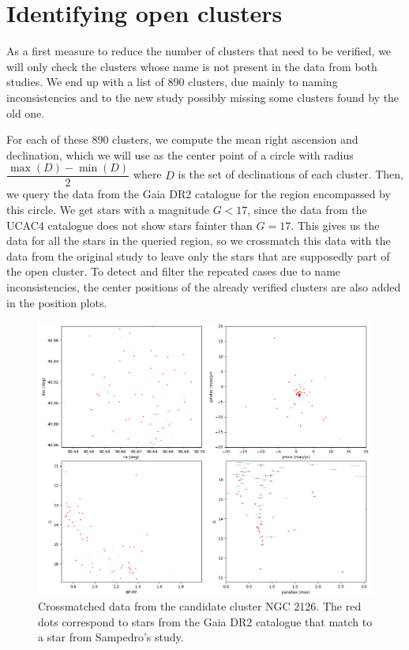 \documentclass[twocolumn]{revtex4}
\begin{document}
\section{Identifying open clusters}

As a first measure to reduce the number of clusters that need to be verified, we will only check the clusters whose name is not present in the data from both studies. We end up with a list of 890 clusters, due mainly to naming inconsistencies and to the new study possibly missing some clusters found by the old one.

For each of these 890 clusters, we compute the mean right ascension and declination, which we will use as the center point of a circle with radius $\dfrac{\max(D) - \min(D)}{2}$ where $D$ is the set of declinations of each cluster. Then, we query the data from the Gaia DR2 catalogue for the region encompassed by this circle. We get stars with a magnitude $G < 17$, since the data from the UCAC4 catalogue does not show stars fainter than $G = 17$. This gives us the data for all the stars in the queried region, so we crossmatch this data with the data from the original study to leave only the stars that are supposedly part of the open cluster. To detect and filter the repeated cases due to name inconsistencies, the center positions of the already verified clusters are also added in the position plots.

\begin{figure}
\centering
\includegraphics[scale=0.5]{NGC_2126_crossmatch}
\caption{Crossmatched data from the candidate cluster NGC 2126. The red dots correspond to stars from the Gaia DR2 catalogue that match to a star from Sampedro's study.}
\label{crossmatched_data}
\end{figure}
\end{document}
